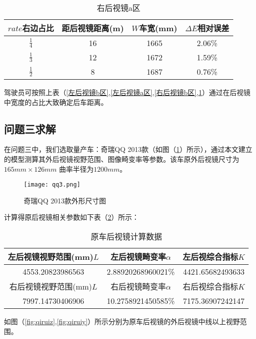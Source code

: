 \documentclass[withoutpreface,bwprint]{cumcmthesis} %
\begin{document}
\begin{table}[!htbp]
\centering
\caption{右后视镜a区}
\label{右后视镜a区}
\begin{tabular}{cccc}
\toprule
$rate$右边占比 & 距后视镜距离(m) & $W$车宽(mm) & $\Delta E$相对误差  \\ \midrule
$\frac{1}{4}$ & 16 & 1665 & 2.06\% \\
$\frac{1}{3}$ & 12 & 1672 & 1.59\% \\
$\frac{1}{2}$ & 8 & 1687 & 0.76\% \\
\bottomrule 
\end{tabular}
\end{table}

\par 驾驶员可按照上表（\ref{左后视镜b区},\ref{左后视镜a区},\ref{右后视镜b区},\ref{右后视镜a区}）通过在后视镜中宽度的占比大致确定后车距离。

\subsection{问题三求解}
\par 在问题三中，我们选取量产车：奇瑞QQ 2013款（如图（\ref{fig:qq3}）所示），通过本文建立的模型测算其外后视镜视野范围、图像畸变率等参数。该车原外后视镜尺寸为$165mm \times 126mm$ 曲率半径为$1200mm$。
\begin{figure}[h]
\small
\centering
\texttt{[image: qq3.png]}
\caption{奇瑞QQ 2013款外形尺寸图} \label{fig:qq3}
\end{figure}

计算得原后视镜相关参数如下表（\ref{原车后视镜计算数据}）所示：
\begin{table}[!htbp]
\centering
\caption{原车后视镜计算数据}
\label{原车后视镜计算数据}
\begin{tabular}{|c|c|c|}
\toprule
左后视镜视野范围(mm)$L$ & 左后视镜畸变率$\alpha$ & 左后视综合指标$K$ \\ \hline 
4553.20823986563 & 2.88920268960021\%  & 4421.65682493633 \\ \hline 


右后视镜视野范围(mm)$L$ & 右后视镜畸变率$\alpha$  & 右后视综合指标$K$ \\ \hline
7997.14730406906 & 10.2758921450585\%  &  7175.36907242147 \\

\bottomrule 
\end{tabular}

\end{table}
\par 如图（\ref{fig:qiruiz},\ref{fig:qiruiy}）所示分别为原车后视镜的外后视镜中线以上视野范围。
\end{document}
